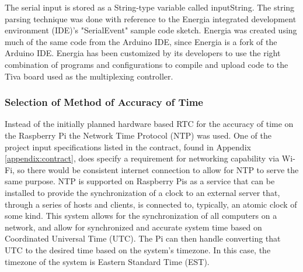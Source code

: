 \documentclass[11pt]{article}
\begin{document}
The serial input is stored as a String-type variable called inputString. 
The string parsing technique was done with reference to the Energia integrated development environment (IDE)'s "SerialEvent" sample code sketch. 
Energia was created using much of the same code from the Arduino IDE, since Energia is a fork of the Arduino IDE. 
Energia has been customized by its developers to use the right combination of programs and configurations to compile and upload code to the Tiva board used as the multiplexing controller.

\subsubsection{Selection of Method of Accuracy of Time} %
\label{RTCDesign}




Instead of the initially planned hardware based RTC for the accuracy of time on the Raspberry Pi the Network Time Protocol (NTP) was used. 
One of the project input specifications listed in the contract, found in Appendix \ref{appendix:contract}, does specify a requirement for networking capability via Wi-Fi, so there would be consistent internet connection to allow for NTP to serve the same purpose. 
NTP is supported on Raspberry Pis as a service that can be installed to provide the synchronization of a clock to an external server that, through a series of hosts and clients, is connected to, typically, an atomic clock of some kind. 
This system allows for the synchronization of all computers on a network, and allow for synchronized and accurate system time based on Coordinated Universal Time (UTC). 
The Pi can then handle converting that UTC to the desired time based on the system's timezone. 
In this case, the timezone of the system is Eastern Standard Time (EST).
\end{document}
